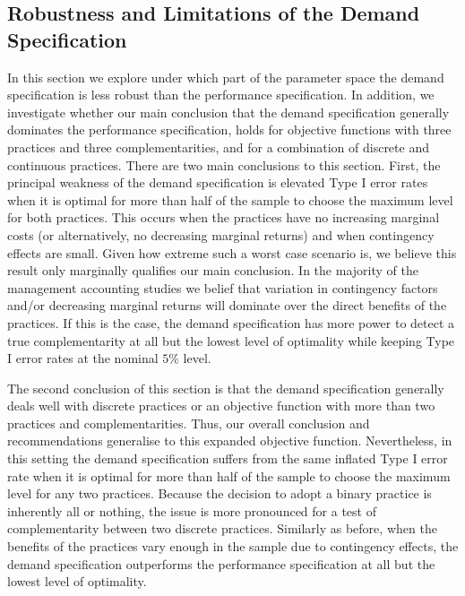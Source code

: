 \documentclass[12pt]{article}
\begin{document}
\subsection{Robustness and Limitations of the Demand Specification} \label{robustness-demand}

In this section we explore under which part of the parameter space the demand specification is less robust than the performance specification. In addition, we investigate whether our main conclusion that the demand specification generally dominates the performance specification, holds for objective functions with three practices and three complementarities, and for a combination of discrete and continuous practices. There are two main conclusions to this section. First, the principal weakness of the demand specification is elevated Type I error rates when it is optimal for more than half of the sample to choose the maximum level for both practices. This occurs when the practices have no increasing marginal costs (or alternatively, no decreasing marginal returns) and when contingency effects are small. Given how extreme such a worst case scenario is, we believe this result only marginally qualifies our main conclusion. In the majority of the management accounting studies we belief that variation in contingency factors and/or decreasing marginal returns will dominate over the direct benefits of the practices. If this is the case, the demand specification has more power to detect a true complementarity at all but the lowest level of optimality while keeping Type I error rates at the nominal $5\%$ level.

The second conclusion of this section is that the demand specification generally deals well with discrete practices or an objective function with more than two practices and complementarities. Thus, our overall conclusion and recommendations generalise to this expanded objective function. Nevertheless, in this setting the demand specification suffers from the same inflated Type I error rate when it is optimal for more than half of the sample to choose the maximum level for any two practices. Because the decision to adopt a binary practice is inherently all or nothing, the issue is more pronounced for a test of complementarity between two discrete practices. Similarly as before, when the benefits of the practices vary enough in the sample due to contingency effects, the demand specification outperforms the performance specification at all but the lowest level of optimality.
\end{document}
